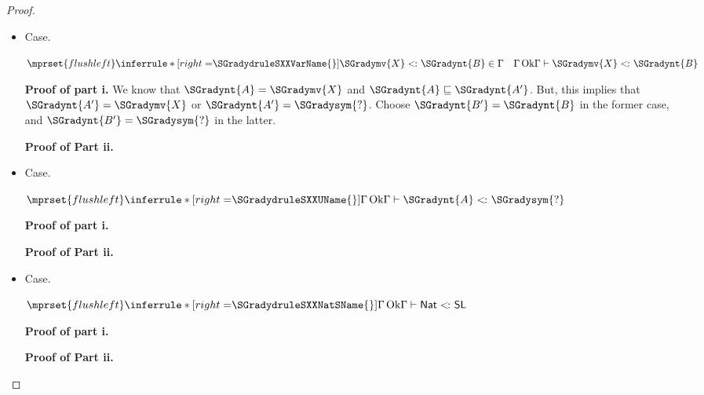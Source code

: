 \begin{proof}
\begin{itemize}
  \item[] Case.\ \\ 
    \begin{center}
      \begin{math}
        $$\mprset{flushleft}
        \inferrule* [right=$\SGradydruleSXXVarName{}$] {
            \SGradymv{X}  <\hspace{-2px}\colon  \SGradynt{B}  \in  \Gamma   \quad   \Gamma \,\text{Ok}  
        }{ \Gamma  \vdash  \SGradymv{X}  <\hspace{-2px}\colon  \SGradynt{B} }
      \end{math}
    \end{center}
    \textbf{Proof of part i.}  We know that $\SGradynt{A} = \SGradymv{X}$ and $ \SGradynt{A}  \sqsubseteq  \SGradynt{A'} $.  But, this implies that
    $\SGradynt{A'} = \SGradymv{X}$ or $\SGradynt{A'} = \SGradysym{\mbox{?}}$.  Choose $\SGradynt{B'} = \SGradynt{B}$ in the former case, and $\SGradynt{B'} = \SGradysym{\mbox{?}}$ in the latter.

    \noindent
    \textbf{Proof of Part ii.}

  \item[] Case.\ \\ 
    \begin{center}
      \begin{math}
        $$\mprset{flushleft}
        \inferrule* [right=$\SGradydruleSXXUName{}$] {
           \Gamma \,\text{Ok} 
        }{ \Gamma  \vdash  \SGradynt{A}  <\hspace{-2px}\colon  \SGradysym{\mbox{?}} }
      \end{math}
    \end{center}    
    \textbf{Proof of part i.}
    
    \noindent
    \textbf{Proof of Part ii.}

  \item[] Case.\ \\ 
    \begin{center}
      \begin{math}
        $$\mprset{flushleft}
        \inferrule* [right=$\SGradydruleSXXNatSName{}$] {
           \Gamma \,\text{Ok} 
        }{ \Gamma  \vdash   \mathsf{Nat}   <\hspace{-2px}\colon   \mathsf{SL}  }
      \end{math}
    \end{center}
    \textbf{Proof of part i.}  

    \noindent
    \textbf{Proof of Part ii.}


\end{itemize}
\end{proof}
